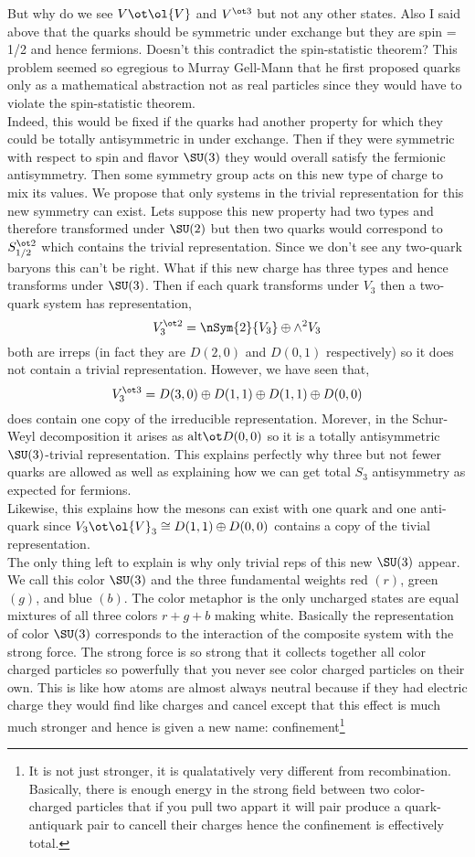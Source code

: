 \documentclass[12pt]{article}
\begin{document}
But why do we see $V \ot \ol{V}$ and $V^{\ot 3}$ but not any other states. Also I said above that the quarks should be symmetric under exchange but they are spin = 1/2 and hence fermions. Doesn't this contradict the spin-statistic theorem? This problem seemed so egregious to Murray Gell-Mann that he first proposed quarks only as a mathematical abstraction not as real particles since they would have to violate the spin-statistic theorem.
\bigskip\\
Indeed, this would be fixed if the quarks had another property for which they could be totally antisymmetric in under exchange. Then if they were symmetric with respect to spin and flavor $\SU(3)$ they would overall satisfy the fermionic antisymmetry. Then some symmetry group acts on this new type of charge to mix its values. We propose that only systems in the trivial representation for this new symmetry can exist. Lets suppose this new property had two types and therefore transformed under $\SU(2)$ but then two quarks would correspond to $S_{1/2}^{\ot 2}$ which contains the trivial representation. Since we don't see any two-quark baryons this can't be right. What if this new charge has three types and hence transforms under $\SU(3)$. Then if each quark transforms under $V_3$ then a two-quark system has representation,
\[ V_3^{\ot 2} = \nSym{2}{V_3} \oplus \wedge^2 V_3 \]
both are irreps (in fact they are $D(2,0)$ and $D(0,1)$ respectively) so it does not contain a trivial representation. However, we have seen that,
\[ V_3^{\ot 3} = D(3,0) \oplus D(1,1) \oplus D(1,1) \oplus D(0,0) \]
does contain one copy of the irreducible representation. Morever, in the Schur-Weyl decomposition it arises as $\alt \ot D(0,0)$ so it is a totally antisymmetric $\SU(3)$-trivial representation. This explains perfectly why three but not fewer quarks are allowed as well as explaining how we can get total $S_3$ antisymmetry as expected for fermions.
\bigskip\\
Likewise, this explains how the mesons can exist with one quark and one anti-quark since $V_3 \ot \ol{V}_3 \cong D(1,1) \oplus D(0,0)$ contains a copy of the tivial representation. 
\bigskip\\
The only thing left to explain is why only trivial reps of this new $\SU(3)$ appear. We call this color $\SU(3)$ and the three fundamental weights red $(r)$, green $(g)$, and blue $(b)$. The color metaphor is the only uncharged states are equal mixtures of all three colors $r + g + b$ making white. Basically the representation of color $\SU(3)$ corresponds to the interaction of the composite system with the strong force. The strong force is so strong that it collects together all color charged particles so powerfully that you never see color charged particles on their own. This is like how atoms are almost always neutral because if they had electric charge they would find like charges and cancel except that this effect is much much stronger and hence is given a new name: confinement\footnote{It is not just stronger, it is qualatatively very different from recombination. Basically, there is enough energy in the strong field between two color-charged particles that if you pull two appart it will pair produce a quark-antiquark pair to cancell their charges hence the confinement is effectively total.}
\end{document}
